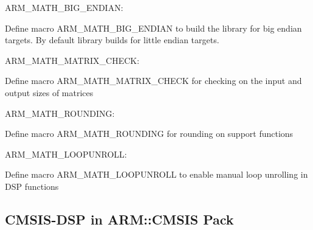\begin{DoxyItemize}
\item A\+R\+M\+\_\+\+M\+A\+T\+H\+\_\+\+B\+I\+G\+\_\+\+E\+N\+D\+I\+AN\+:
\end{DoxyItemize}

Define macro A\+R\+M\+\_\+\+M\+A\+T\+H\+\_\+\+B\+I\+G\+\_\+\+E\+N\+D\+I\+AN to build the library for big endian targets. By default library builds for little endian targets.


\begin{DoxyItemize}
\item A\+R\+M\+\_\+\+M\+A\+T\+H\+\_\+\+M\+A\+T\+R\+I\+X\+\_\+\+C\+H\+E\+CK\+:
\end{DoxyItemize}

Define macro A\+R\+M\+\_\+\+M\+A\+T\+H\+\_\+\+M\+A\+T\+R\+I\+X\+\_\+\+C\+H\+E\+CK for checking on the input and output sizes of matrices


\begin{DoxyItemize}
\item A\+R\+M\+\_\+\+M\+A\+T\+H\+\_\+\+R\+O\+U\+N\+D\+I\+NG\+:
\end{DoxyItemize}

Define macro A\+R\+M\+\_\+\+M\+A\+T\+H\+\_\+\+R\+O\+U\+N\+D\+I\+NG for rounding on support functions


\begin{DoxyItemize}
\item A\+R\+M\+\_\+\+M\+A\+T\+H\+\_\+\+L\+O\+O\+P\+U\+N\+R\+O\+LL\+:
\end{DoxyItemize}

Define macro A\+R\+M\+\_\+\+M\+A\+T\+H\+\_\+\+L\+O\+O\+P\+U\+N\+R\+O\+LL to enable manual loop unrolling in D\+SP functions



 \subsection*{C\+M\+S\+I\+S-\/\+D\+SP in A\+R\+M\+::\+C\+M\+S\+IS Pack }

